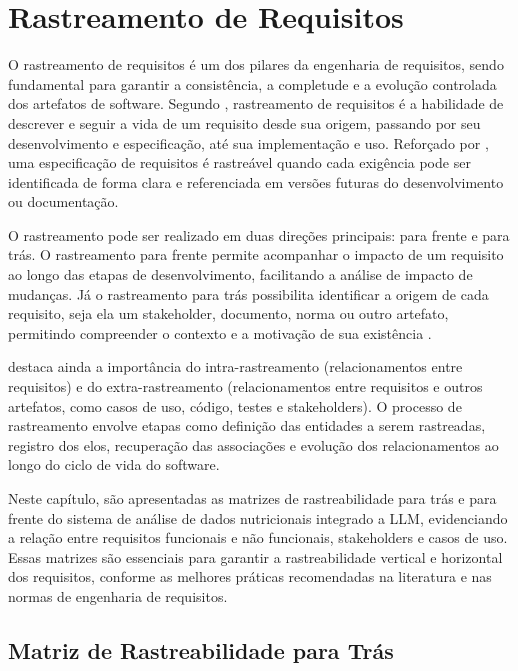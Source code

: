 \chapter{Rastreamento de Requisitos}\label{cap:5-rast-req}

O rastreamento de requisitos é um dos pilares da engenharia de requisitos, sendo fundamental para garantir a consistência, a completude e a evolução controlada dos artefatos de software. Segundo \cite{gotel1994traceability}, rastreamento de requisitos é a habilidade de descrever e seguir a vida de um requisito desde sua origem, passando por seu desenvolvimento e especificação, até sua implementação e uso. Reforçado por \cite{goncalves2004ieee830}, uma especificação de requisitos é rastreável quando cada exigência pode ser identificada de forma clara e referenciada em versões futuras do desenvolvimento ou documentação.

O rastreamento pode ser realizado em duas direções principais: para frente e para trás. O rastreamento para frente permite acompanhar o impacto de um requisito ao longo das etapas de desenvolvimento, facilitando a análise de impacto de mudanças. Já o rastreamento para trás possibilita identificar a origem de cada requisito, seja ela um stakeholder, documento, norma ou outro artefato, permitindo compreender o contexto e a motivação de sua existência \cite{wieringa1995introduction}.

\cite{pinheiro2003requirements} destaca ainda a importância do intra-rastreamento (relacionamentos entre requisitos) e do extra-rastreamento (relacionamentos entre requisitos e outros artefatos, como casos de uso, código, testes e stakeholders). O processo de rastreamento envolve etapas como definição das entidades a serem rastreadas, registro dos elos, recuperação das associações e evolução dos relacionamentos ao longo do ciclo de vida do software.

Neste capítulo, são apresentadas as matrizes de rastreabilidade para trás e para frente do sistema de análise de dados nutricionais integrado a LLM, evidenciando a relação entre requisitos funcionais e não funcionais, stakeholders e casos de uso. Essas matrizes são essenciais para garantir a rastreabilidade vertical e horizontal dos requisitos, conforme as melhores práticas recomendadas na literatura e nas normas de engenharia de requisitos.

\section{Matriz de Rastreabilidade para Trás}

